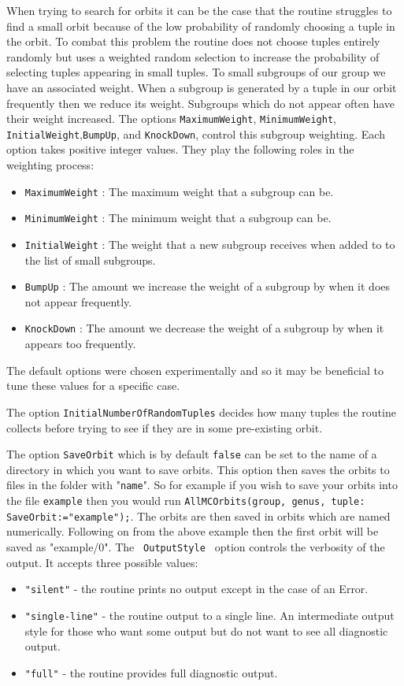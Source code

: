 \documentclass[a4paper,11pt]{report}
\begin{document}
{{{ When trying to search for orbits it can be the case that the routine struggles
to find a small orbit because of the low probability of randomly choosing a
tuple in the orbit. To combat this problem the routine does not choose tuples
entirely randomly but uses a weighted random selection to increase the
probability of selecting tuples appearing in small tuples. To small subgroups
of our group we have an associated weight. When a subgroup is generated by a
tuple in our orbit frequently then we reduce its weight. Subgroups which do
not appear often have their weight increased. The options \texttt{MaximumWeight}, \texttt{MinimumWeight}, \texttt{InitialWeight},\texttt{BumpUp}, and \texttt{KnockDown}, control this subgroup weighting. Each option takes positive integer values.
They play the following roles in the weighting process: 
\begin{itemize}
\item \texttt{MaximumWeight} : The maximum weight that a subgroup can be. 
\item \texttt{MinimumWeight} : The minimum weight that a subgroup can be. 
\item \texttt{InitialWeight} : The weight that a new subgroup receives when added to to the list of small
subgroups. 
\item \texttt{BumpUp} : The amount we increase the weight of a subgroup by when it does not appear
frequently. 
\item \texttt{KnockDown} : The amount we decrease the weight of a subgroup by when it appears too
frequently. 
\end{itemize}
 The default options were chosen experimentally and so it may be beneficial to
tune these values for a specific case.

 The option \texttt{InitialNumberOfRandomTuples} decides how many tuples the routine collects before trying to see if they are
in some pre-existing orbit.

 The option \texttt{SaveOrbit} which is by default \texttt{false} can be set to the name of a directory in which you want to save orbits. This
option then saves the orbits to files in the folder with "\texttt{{\textunderscore}name}". So for example if you wish to save your orbits into the file \texttt{{\textunderscore}example} then you would run \texttt{AllMCOrbits(group, genus, tuple: SaveOrbit:="example");}. The orbits are then saved in orbits which are named numerically. Following
on from the above example then the first orbit will be saved as
"{\textunderscore}example/0". The \texttt{ OutputStyle } option controls the verbosity of the output. It accepts three possible values: 
\begin{itemize}
\item  \texttt{"silent"} - the routine prints no output except in the case of an Error. 
\item  \texttt{"single-line"} - the routine output to a single line. An intermediate output style for those
who want some output but do not want to see all diagnostic output. 
\item  \texttt{"full"} - the routine provides full diagnostic output. 
\end{itemize}
 }

}}
\end{document}
